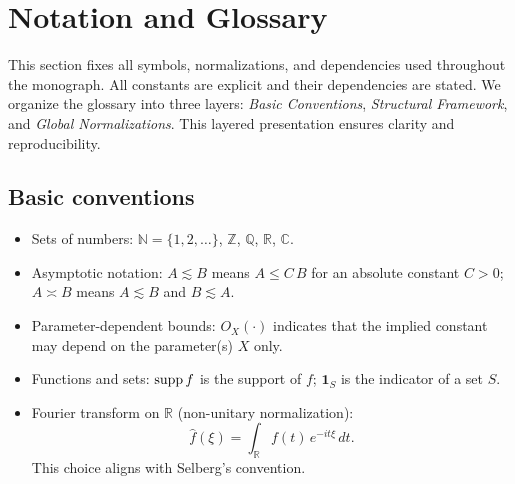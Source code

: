 \section{Notation and Glossary}

This section fixes all symbols, normalizations, and dependencies used throughout the monograph. 
All constants are explicit and their dependencies are stated. 
We organize the glossary into three layers: 
\emph{Basic Conventions}, \emph{Structural Framework}, and \emph{Global Normalizations}. 
This layered presentation ensures clarity and reproducibility.

\subsection*{Basic conventions}
\begin{itemize}
  \item Sets of numbers: $\mathbb{N}=\{1,2,\dots\}$, $\mathbb{Z}$, $\mathbb{Q}$, $\mathbb{R}$, $\mathbb{C}$.
  \item Asymptotic notation: 
    $A\lesssim B$ means $A\le C\,B$ for an absolute constant $C>0$; 
    $A\asymp B$ means $A\lesssim B$ and $B\lesssim A$.
  \item Parameter-dependent bounds: 
    $O_X(\cdot)$ indicates that the implied constant may depend on the parameter(s) $X$ only.
  \item Functions and sets: 
    $\operatorname{supp} f$ is the support of $f$; 
    $\mathbf{1}_S$ is the indicator of a set $S$.
  \item Fourier transform on $\mathbb{R}$ (non-unitary normalization): 
    \[
      \widehat{f}(\xi)=\int_{\mathbb{R}} f(t)\,e^{-i t \xi}\,dt.
    \]
    This choice aligns with Selberg’s convention.
\end{itemize}

